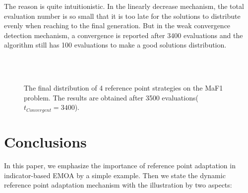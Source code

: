 \documentclass[conference]{IEEEtran}
\begin{document}
The reason is quite intuitionistic.
In the linearly decrease mechanism, the total evaluation number is so small that it is too late for the solutions 
to distribute evenly when reaching to the final generation. 
But in the weak convergence detection mechanism, a convergence is reported after 3400 evaluations and 
the algorithm still has 100 evaluations to make a good solutions distribution. 
\begin{figure}[!t]
  \centering
  \quad
  \\
  \quad
  \\
  \caption{
    The final distribution of 4 reference point strategies on the MaF1 problem.
    The results are obtained after 3500 evaluations($t_{Convergent} = 3400$).
  }
  \label{ctdm}
\end{figure} 

\section{Conclusions}
In this paper, we emphasize the importance of reference point adaptation 
in indicator-based EMOA by a simple example. 
Then we state the dynamic reference point adaptation mechanism with the illustration by two aspects:
\end{document}
